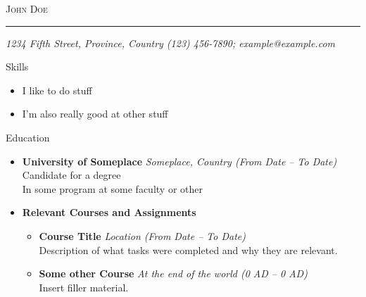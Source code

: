 \documentclass[11pt,oneside]{article}
\newcommand{\bigname}[1]{
    \begin{center}\fontfamily{phv}\selectfont\Huge\scshape#1\end{center}
}
\newcommand{\respara}[1]{
    \vspace{4pt}
    {\fontfamily{phv} \selectfont \Large #1} \\
    \vspace{4pt}
    \hspace{19pt}
}
\newenvironment{ressection}[1]{
    \respara{#1}
    \begin{itemize}
    \vspace{-20pt}
}{
    \end{itemize}
}
\newenvironment{ressubsection}[1]{
    \resitem{\textbf{#1}}
    \vspace{-5pt}
    \begin{itemize}
}{
    \end{itemize}
}
\newcommand{\resitem}[1]{
    \vspace{-4pt}
    \item \begin{flushleft} #1 \end{flushleft}
}
\newcommand{\resbigitem}[3]{
    \item
    \textbf{#1} \hfill \textit{#2} \\
    #3
}
\begin{document}
 \selectfont
\bigname{John Doe}
\vspace{-8pt} \rule{\textwidth}{1pt}
\vspace{-1pt} {\small\itshape 1234 Fifth Street, Province, Country \hfill (123) 456-7890; example@example.com}
\vspace{8 pt}


\begin{ressection}{Skills}
\resitem{I like to do stuff}
\resitem{I'm also really good at other stuff}
\end{ressection}
\begin{ressection}{Education}
\resbigitem{University of Someplace}{Someplace, Country (From Date -- To Date)}{Candidate for a degree\\In some program at some faculty or other}
\begin{ressubsection}{Relevant Courses and Assignments}
\resbigitem{Course Title}{Location (From Date -- To Date)}{Description of what tasks were completed and why they are relevant.}
\resbigitem{Some other Course}{At the end of the world (0 AD -- 0 AD)}{Insert filler material.}
\end{ressubsection}
\end{ressection}
\end{document}
